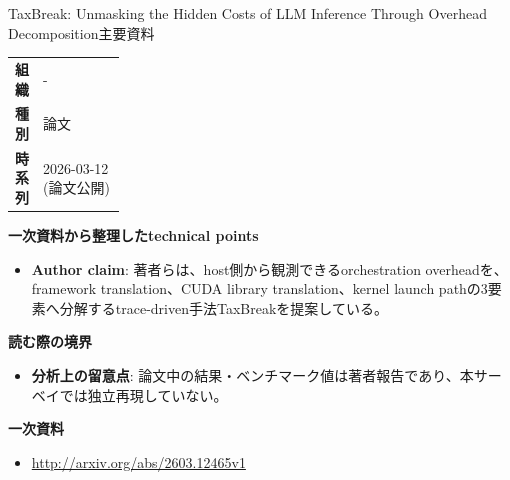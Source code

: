 \begin{technicalnote}{TaxBreak: Unmasking the Hidden Costs of LLM Inference Through Overhead Decomposition}{主要資料}
\begingroup
\begin{tabularx}{\linewidth}{@{}>{\bfseries}p{0.22\linewidth}X@{}}
組織 & - \\
種別 & 論文 \\
時系列 & 2026-03-12 (論文公開) \\
\end{tabularx}
\smallskip
{\bfseries 一次資料から整理したtechnical points}
\begin{itemize}[leftmargin=1.5em,itemsep=0.35em]
\item \textbf{Author claim}: 著者らは、host側から観測できるorchestration overheadを、framework translation、CUDA library translation、kernel launch pathの3要素へ分解するtrace-driven手法TaxBreakを提案している。
\end{itemize}
\begin{minipage}{\linewidth}
{\bfseries 読む際の境界}
\begin{itemize}[leftmargin=1.5em,itemsep=0.35em]
\item \textbf{分析上の留意点}: 論文中の結果・ベンチマーク値は著者報告であり、本サーベイでは独立再現していない。
\end{itemize}
\begin{samepage}
{\bfseries 一次資料}
\begingroup\sloppy
\begin{itemize}[leftmargin=1.5em,itemsep=0.25em]
\item {\scriptsize\url{http://arxiv.org/abs/2603.12465v1}}
\end{itemize}
\endgroup
\end{samepage}
\end{minipage}
\endgroup
\end{technicalnote}
\medskip

